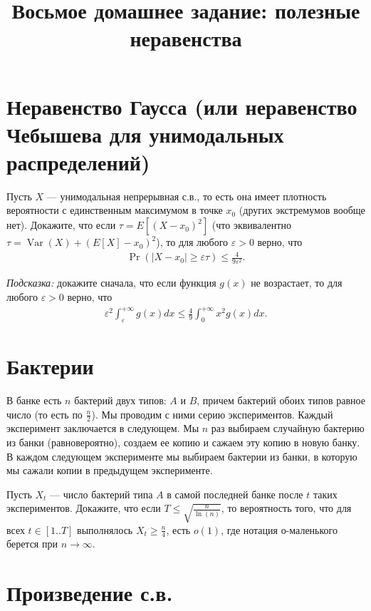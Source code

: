 \documentclass[12pt]{article}
\title{Восьмое домашнее задание: полезные неравенства}
\newcommand\eps{\varepsilon}
\DeclareMathOperator{\Var}{Var}
\begin{document}
\maketitle

\section{Неравенство Гаусса (или неравенство Чебышева для унимодальных распределений)}

Пусть $X$ --- унимодальная непрерывная с.в., то есть она имеет плотность вероятности с единственным максимумом в точке $x_0$ (других экстремумов вообще нет). Докажите, что если $\tau = E[(X - x_0)^2]$ (что эквивалентно $\tau = \Var(X) + (E[X] - x_0)^2$), то для любого $\eps > 0$ верно, что
\begin{align*}
    \Pr(|X - x_0| \ge \eps\tau) \le \frac{4}{9\eps^2}.
\end{align*}

\emph{Подсказка:} докажите сначала, что если функция $g(x)$ не возрастает, то для любого $\eps > 0$ верно, что
\begin{align*}
    \eps^2 \int_\eps^{+\infty} g(x) dx \le \frac{4}{9} \int_{0}^{+\infty} x^2 g(x) dx.
\end{align*} 

\section{Бактерии}

В банке есть $n$ бактерий двух типов: $A$ и $B$, причем бактерий обоих типов равное число (то есть по $\frac{n}{2}$). Мы проводим с ними серию экспериментов. Каждый эксперимент заключается в следующем. Мы $n$ раз выбираем случайную бактерию из банки (равновероятно), создаем ее копию и сажаем эту копию в новую банку. В каждом следующем эксперименте мы выбираем бактерии из банки, в которую мы сажали копии в предыдущем эксперименте.

Пусть $X_t$ --- число бактерий типа $A$ в самой последней банке после $t$ таких экспериментов. Докажите, что если $T \le \sqrt{\frac{n}{\ln(n)}}$, то вероятность того, что для всех $t \in [1..T]$ выполнялось $X_t \ge \frac{n}{4}$, есть $o(1)$, где нотация о-маленького берется при $n \to \infty$.

\section{Произведение с.в.}
\end{document}

